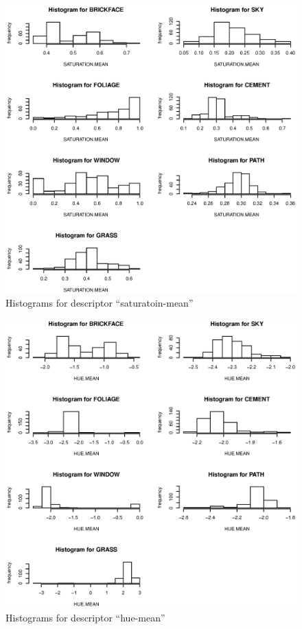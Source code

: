 \documentclass{article}
\begin{document}
\clearpage

\begin{figure}[htp]
\centering
\includegraphics[width=12cm]{a18.eps}
\caption{Histograms for descriptor ``saturatoin-mean''}
\end{figure}

\begin{figure}[htp]
\centering
\includegraphics[width=12cm]{a19.eps}
\caption{Histograms for descriptor ``hue-mean''}
\end{figure}
\end{document}
